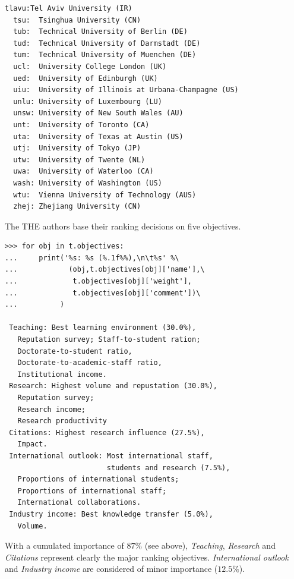 \begin{lstlisting}[caption={Printing the potential decision actions},label=list:13.2]
  tlavu:Tel Aviv University (IR)
  tsu:	Tsinghua University (CN)
  tub:	Technical University of Berlin (DE)
  tud:	Technical University of Darmstadt (DE)
  tum:	Technical University of Muenchen (DE)
  ucl:	University College London (UK)
  ued:	University of Edinburgh (UK)
  uiu:	University of Illinois at Urbana-Champagne (US)
  unlu:	University of Luxembourg (LU)
  unsw:	University of New South Wales (AU)
  unt:	University of Toronto (CA)
  uta:	University of Texas at Austin (US)
  utj:	University of Tokyo (JP)
  utw:	University of Twente (NL)
  uwa:	University of Waterloo (CA)
  wash:	University of Washington (US)
  wtu:	Vienna University of Technology (AUS)
  zhej:	Zhejiang University (CN)
\end{lstlisting}

The THE authors base their ranking decisions on five objectives.

\begin{lstlisting}[caption={The THE ranking objectives},label=list:13.3]
>>> for obj in t.objectives:
...     print('%s: %s (%.1f%%),\n\t%s' %\
...            (obj,t.objectives[obj]['name'],\
...             t.objectives[obj]['weight'],
...             t.objectives[obj]['comment'])\
...          )
   
 Teaching: Best learning environment (30.0%),
   Reputation survey; Staff-to-student ration;
   Doctorate-to-student ratio,
   Doctorate-to-academic-staff ratio,
   Institutional income.
 Research: Highest volume and repustation (30.0%),
   Reputation survey;
   Research income;
   Research productivity
 Citations: Highest research influence (27.5%),
   Impact.
 International outlook: Most international staff,
                        students and research (7.5%),
   Proportions of international students;
   Proportions of international staff;
   International collaborations.
 Industry income: Best knowledge transfer (5.0%),
   Volume.
\end{lstlisting}

With a cumulated importance of $87\%$ (see above), \emph{Teaching}, \emph{Research} and \emph{Citations} represent clearly the major ranking objectives. \emph{International outlook} and \emph{Industry income} are considered of minor importance ($12.5\%$).

